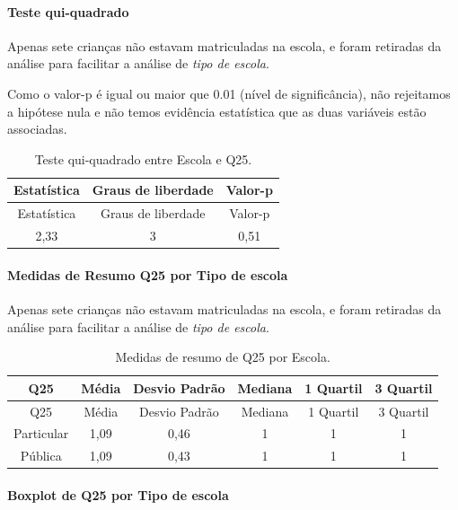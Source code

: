\documentclass[]{article}
\let\oldparagraph\paragraph
\renewcommand{\paragraph}[1]{\oldparagraph{#1}\mbox{}}
\begin{document}
\hypertarget{teste-qui-quadrado-61}{%
\paragraph{Teste qui-quadrado}\label{teste-qui-quadrado-61}}

Apenas sete crianças não estavam matriculadas na escola, e foram retiradas da análise para facilitar a análise de \emph{tipo de escola}.

Como o valor-p é igual ou maior que 0.01 (nível de significância), não rejeitamos a hipótese nula e não temos evidência estatística que as duas variáveis estão associadas.

\begin{longtable}[]{@{}ccc@{}}
\caption{\label{tab:unnamed-chunk-704}Teste qui-quadrado entre Escola e Q25.}\tabularnewline
\toprule
Estatística & Graus de liberdade & Valor-p\tabularnewline
\midrule
\endfirsthead
\toprule
Estatística & Graus de liberdade & Valor-p\tabularnewline
\midrule
\endhead
2,33 & 3 & 0,51\tabularnewline
\bottomrule
\end{longtable}

\cleardoublepage

\hypertarget{medidas-de-resumo-q25-por-tipo-de-escola}{%
\paragraph{Medidas de Resumo Q25 por Tipo de escola}\label{medidas-de-resumo-q25-por-tipo-de-escola}}

Apenas sete crianças não estavam matriculadas na escola, e foram retiradas da análise para facilitar a análise de \emph{tipo de escola}.

\begin{longtable}[]{@{}cccccc@{}}
\caption{\label{tab:unnamed-chunk-705}Medidas de resumo de Q25 por Escola.}\tabularnewline
\toprule
Q25 & Média & Desvio Padrão & Mediana & 1 Quartil & 3 Quartil\tabularnewline
\midrule
\endfirsthead
\toprule
Q25 & Média & Desvio Padrão & Mediana & 1 Quartil & 3 Quartil\tabularnewline
\midrule
\endhead
Particular & 1,09 & 0,46 & 1 & 1 & 1\tabularnewline
Pública & 1,09 & 0,43 & 1 & 1 & 1\tabularnewline
\bottomrule
\end{longtable}

\hypertarget{boxplot-de-q25-por-tipo-de-escola}{%
\paragraph{Boxplot de Q25 por Tipo de escola}\label{boxplot-de-q25-por-tipo-de-escola}}
\end{document}
